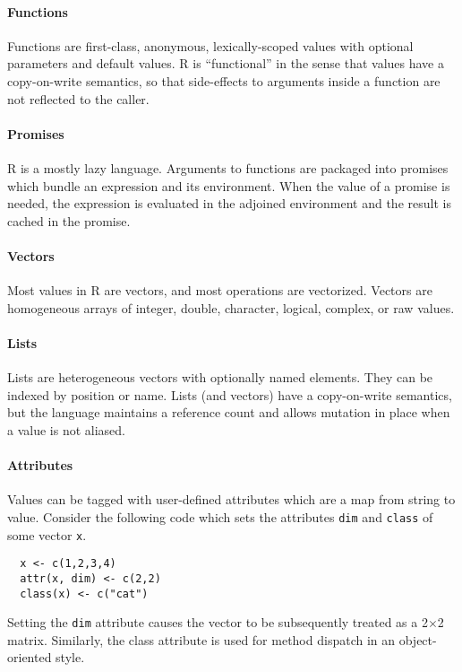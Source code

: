 \documentclass[10pt,review,sigplan,anonymous=true,authorversion=true,nonacm=true]{acmart}
\newcommand{\code}[1]{\lstinline |#1|\xspace}
\renewcommand{\c}[1]{\lstinline |#1|\xspace}
\begin{document}
\paragraph{Functions} Functions are first-class, anonymous, lexically-scoped values
with optional parameters and default values. R is ``functional'' in the sense
that values have a copy-on-write semantics, so that side-effects to arguments
inside a function are not reflected to the caller.

\paragraph{Promises} R is a mostly lazy language.  Arguments to functions are
packaged into promises which bundle an expression and its environment. When the
value of a promise is needed, the expression is evaluated in the adjoined
environment and the result is cached in the promise.

\paragraph{Vectors}  Most values in R are vectors, and most operations are
vectorized. Vectors are homogeneous arrays of integer, double,
character, logical, complex, or raw values.

\paragraph{Lists} Lists are heterogeneous vectors with optionally named elements.
They can be indexed by position or name. Lists (and vectors) have a
copy-on-write semantics, but the language maintains a reference count and allows
mutation in place when a value is not aliased.


\paragraph{Attributes}
Values can be tagged with user-defined attributes which are a map from string to
value. Consider the following code which sets the attributes \code{dim} and
\c{class} of some vector \code{x}.

\begin{lstlisting}
  x <- c(1,2,3,4)
  attr(x, dim) <- c(2,2)
  class(x) <- c("cat")
\end{lstlisting}

Setting the \code{dim} attribute causes the vector to be subsequently treated as
a 2$\times$2 matrix. Similarly, the class attribute is used for method dispatch
in an object-oriented style.
\end{document}
